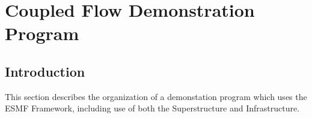 
\section{Coupled Flow Demonstration Program}

\subsection{Introduction}

This section describes the organization of a
demonstation program which uses the ESMF Framework,
including use of both the 
Superstructure and Infrastructure.


